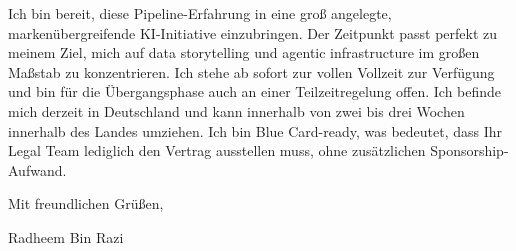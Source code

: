 \documentclass[11pt,a4paper]{coverletter}
\begin{document}
Ich bin bereit, diese Pipeline-Erfahrung in eine groß angelegte, markenübergreifende KI-Initiative einzubringen. Der Zeitpunkt passt perfekt zu meinem Ziel, mich auf data storytelling und agentic infrastructure im großen Maßstab zu konzentrieren. Ich stehe ab sofort zur vollen Vollzeit zur Verfügung und bin für die Übergangsphase auch an einer Teilzeitregelung offen. Ich befinde mich derzeit in Deutschland und kann innerhalb von zwei bis drei Wochen innerhalb des Landes umziehen. Ich bin Blue Card-ready, was bedeutet, dass Ihr Legal Team lediglich den Vertrag ausstellen muss, ohne zusätzlichen Sponsorship-Aufwand.

\closing{Mit freundlichen Grüßen,}{Radheem Bin Razi}
\end{document}
